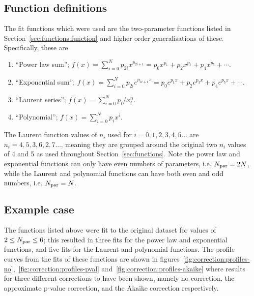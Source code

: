 \subsection{Function definitions}
\label{sec:correction:functions}
The fit functions which were used are the two-parameter functions listed in
Section~\ref{sec:functions:function} and higher order generalisations of
these. Specifically, these are
\begin{enumerate}
\item
``Power law sum''; $f(x) = \sum_{i=0}^N p_{2i} x^{p_{2i+1}} = p_{0}x^{p_{1}} + p_{2}x^{p_{3}} + p_{4}x^{p_{5}}+\cdots$.
\item
``Exponential sum''; $f(x) = \sum_{i=0}^N p_{2i} e^{p_{2i+1}x} = p_{0} e^{p_{1}x} + p_{2} e^{p_{3}x} + p_{4} e^{p_{5}x}+\cdots$.
\item
``Laurent series''; $f(x) = \sum_{i=0}^N p_i/x^n_{i}$.
\item
``Polynomial''; $f(x) = \sum_{i=0}^N p_i x^i$.
\end{enumerate}
The Laurent function values of $n_{i}$ used for $i=0,1,2,3,4,5\dots$ are
$n_{i}=4,5,3,6,2,7\dots$, meaning they are grouped around the original
two $n_{i}$ values of 4 and 5 as used throughout Section~\ref{sec:functions}.
Note the power law and exponential functions can only have even numbers of
parameters, i.e. $N_{\rm par}=2N$, while the Laurent and polynomial functions
can have both even and odd numbers, i.e. $N_{\rm par}=N$.


\subsection{Example case}
\label{sec:correction:example}

The functions listed above were fit to the original dataset for values of
$2 \le N_{\rm par} \le 6$; this resulted in three fits for the power law and
exponential functions, and five fits for the Laurent and polynomial functions.
The profile curves from the fits of these functions are shown in
figures~\ref{fig:correction:profiles-no},~\ref{fig:correction:profiles-pval} and~\ref{fig:correction:profiles-akaike} where results for three different
corrections to \nll have been shown, namely no correction, the approximate
p-value correction, and the Akaike correction respectively.

